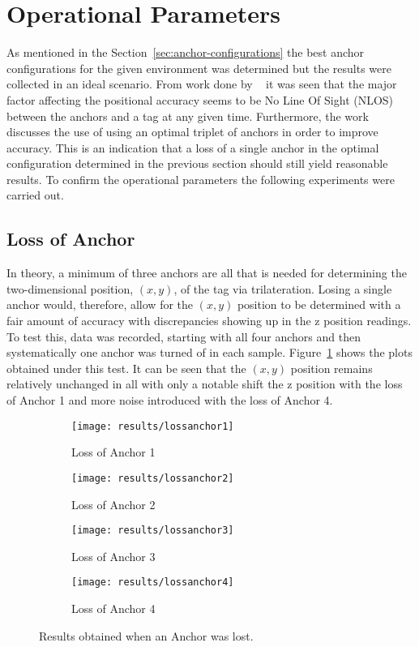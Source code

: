 \section{Operational Parameters}\label{sec:op-params}
As mentioned in the Section~\ref{sec:anchor-configurations} the best anchor configurations for the given environment was determined  but the results were collected in an ideal scenario.
From work done by ~\citet{evaluwb} it was seen that the major factor affecting the positional accuracy seems to be No Line Of Sight (NLOS) between the anchors and a tag at any given time.
Furthermore, the work discusses the use of using an optimal triplet of anchors in order to improve accuracy.
This is an indication that a loss of a single anchor in the optimal configuration determined in the previous section should still yield reasonable results.
To confirm the operational parameters the following experiments were carried out.

\subsection{Loss of Anchor}\label{subsec:loss-of-anchor}
In theory, a minimum of three anchors are all that is needed for determining the two-dimensional position, $(x,y)$, of the tag via trilateration.
Losing a single anchor would, therefore, allow for the $(x,y)$ position to be determined with a fair amount of accuracy with discrepancies showing up in the z position readings.
To test this, data was recorded, starting with all four anchors and then systematically one anchor was turned of in each sample.
Figure~\ref{fig:Loss_anchors} shows the plots obtained under this test.
It can be seen that the $(x,y)$ position remains relatively unchanged in all with only a notable shift the z position with the loss of Anchor 1 and more noise introduced with the loss of Anchor 4.

\begin{figure}[h!]
    \centering
    \begin{subfigure}{0.45\textwidth}
            \texttt{[image: results/lossanchor1]}
            \caption{Loss of Anchor 1}
    \end{subfigure}
    \begin{subfigure}{0.45\textwidth}
            \texttt{[image: results/lossanchor2]}
            \caption{Loss of Anchor 2}
    \end{subfigure}

    \begin{subfigure}{0.45\textwidth}
            \texttt{[image: results/lossanchor3]}
            \caption{Loss of Anchor 3}
    \end{subfigure}
    \begin{subfigure}{0.45\textwidth}
            \texttt{[image: results/lossanchor4]}
            \caption{Loss of Anchor 4}
    \end{subfigure}
    \caption{Results obtained when an Anchor was lost.}
    \label{fig:Loss_anchors}
\end{figure}
\newpage
